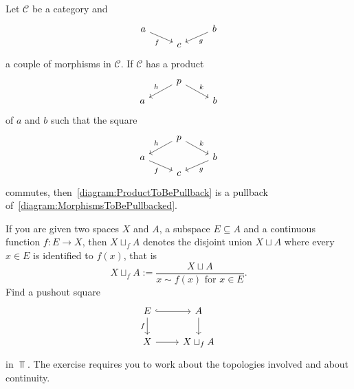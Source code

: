 \begin{lemma}
  Let \(\mathcal{C}\) be a category and
  \begin{equation}\begin{tikzcd}[row sep=tiny]
      a \ar["f", dr, swap] &   & b \ar["g", dl] \\
      & c &
    \end{tikzcd}\label{diagram:MorphismsToBePullbacked}\end{equation}
  a couple of morphisms in \(\mathcal{C}\). If \(\mathcal{C}\) has a product
  \begin{equation}\begin{tikzcd}[row sep=tiny]
      & p \ar["h", dl, swap] \ar["k", dr] &   \\
      a & & b
    \end{tikzcd}\label{diagram:ProductToBePullback}\end{equation}
  of \(a\) and \(b\) such that the square
  \[\begin{tikzcd}[row sep=tiny]
      & p \ar["h", dl, swap] \ar["k", dr] &   \\
      a \ar["f", dr, swap] &   & b \ar["g", dl] \\
      & c &
    \end{tikzcd}\] commutes, then~\eqref{diagram:ProductToBePullback} is
  a pullback of~\eqref{diagram:MorphismsToBePullbacked}.
\end{lemma}

\begin{exercise}
  If you are given two spaces \(X\) and \(A\), a subspace
  \(E \subseteq A\) and a continuous function \(f : E \to X\), then
  \(X \sqcup_f A\) denotes the disjoint union \(X \sqcup A\) where every
  \(x \in E\) is identified to \(f(x)\), that
  is%
  \[X \sqcup_f A := \frac{X \sqcup A}{x \sim f(x) \text{ for } x \in E}
    .\] Find a pushout square
  \[\begin{tikzcd}
      E \ar[r, hookrightarrow] \ar["f", d, swap] & A \ar[d]     \\
      X \ar[r] & X \sqcup_f A
    \end{tikzcd}\] in \(\Top\). The exercise requires you to work about
  the topologies involved and about continuity.
\end{exercise}

